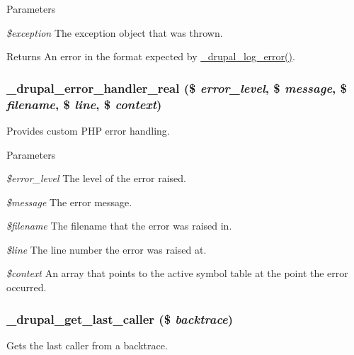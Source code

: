 \begin{DoxyParams}{Parameters}
\item[{\em \$exception}]The exception object that was thrown.\end{DoxyParams}
\begin{DoxyReturn}{Returns}
An error in the format expected by \hyperlink{errors_8inc_adae530f2d49e1067ab4e9dd5753e387a}{\_\-drupal\_\-log\_\-error()}. 
\end{DoxyReturn}
\hypertarget{errors_8inc_a265af3be0f1c7ec1e99c0ed8bea5b0ad}{
\subsubsection[{\_\-drupal\_\-error\_\-handler\_\-real}]{\setlength{\rightskip}{0pt plus 5cm}\_\-drupal\_\-error\_\-handler\_\-real (\$ {\em error\_\-level}, \/  \$ {\em message}, \/  \$ {\em filename}, \/  \$ {\em line}, \/  \$ {\em context})}}
\label{errors_8inc_a265af3be0f1c7ec1e99c0ed8bea5b0ad}
Provides custom PHP error handling.


\begin{DoxyParams}{Parameters}
\item[{\em \$error\_\-level}]The level of the error raised. \item[{\em \$message}]The error message. \item[{\em \$filename}]The filename that the error was raised in. \item[{\em \$line}]The line number the error was raised at. \item[{\em \$context}]An array that points to the active symbol table at the point the error occurred. \end{DoxyParams}
\hypertarget{errors_8inc_aaab8bb3b535ed8bc605afc3f28dc7809}{
\subsubsection[{\_\-drupal\_\-get\_\-last\_\-caller}]{\setlength{\rightskip}{0pt plus 5cm}\_\-drupal\_\-get\_\-last\_\-caller (\$ {\em backtrace})}}
\label{errors_8inc_aaab8bb3b535ed8bc605afc3f28dc7809}
Gets the last caller from a backtrace.


